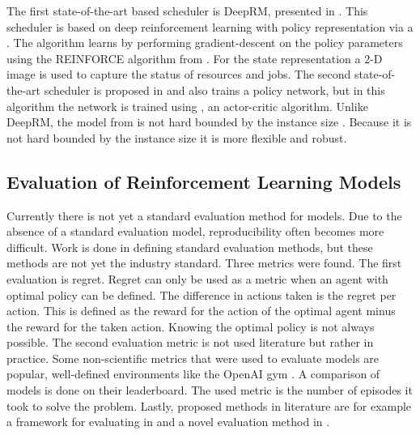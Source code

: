 The first state-of-the-art \rl based scheduler is DeepRM, presented in
. This scheduler is based on deep reinforcement learning with
policy representation via a \dnn. The algorithm learns by performing
gradient-descent on the policy parameters using the REINFORCE algorithm from
. For the state representation a 2-D image is used to
capture the status of resources and jobs. The second state-of-the-art
scheduler is proposed in  and also trains a policy network,
but in this algorithm the network is trained using \ppo, an actor-critic
algorithm. Unlike DeepRM, the model from  is not hard bounded
by the instance size \cite[p.~5]{zhang2020}. Because it is not hard bounded by
the instance size it is more flexible and robust.




\subsection{Evaluation of Reinforcement Learning Models}\label{sec:evaluation}


Currently there is not yet a standard evaluation method for \rl models. Due to
the absence of a standard evaluation model, reproducibility often becomes more
difficult. Work is done in defining standard evaluation methods, but these
methods are not yet the industry standard. Three metrics were found. The first
evaluation is regret. Regret can only be used as a metric when an agent with
optimal policy can be defined. The difference in actions taken is the regret
per action. This is defined as the reward for the action of the optimal agent
minus the reward for the taken action. Knowing the optimal policy is not
always possible. The second evaluation metric is not used literature but
rather in practice. Some non-scientific metrics that were used to evaluate \rl
models are popular, well-defined environments like the OpenAI gym
\cite{gym2016}. A comparison of \rl models is done on their
leaderboard. The used metric
is the number of episodes it took to solve the problem. Lastly, proposed
methods in literature are for example a framework for evaluating \rl in
 and a novel evaluation method in .


